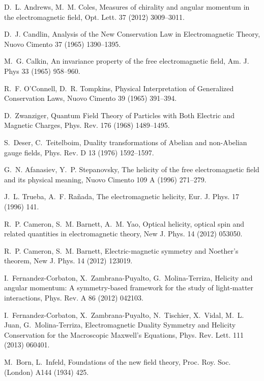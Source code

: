 \documentclass[1p,sort&compress]{elsarticle}
\numberwithin{equation}{section}
\begin{document}
\begin{thebibliography}{999}
D.~L. Andrews, M.~M. Coles, {Measures of chirality and angular momentum in the
  electromagnetic field}, Opt. Lett. 37 (2012) 3009--3011.

D.~J. Candlin, {Analysis of the New Conservation Law in Electromagnetic
  Theory}, Nuovo Cimento 37 (1965) 1390--1395.

M.~G. Calkin, {An invariance property of the free electromagnetic field}, Am.
  J. Phys 33 (1965) 958--960.

R.~F. O'Connell, D.~R. Tompkins, {Physical Interpretation of Generalized
  Conservation Laws}, Nuovo Cimento 39 (1965) 391--394.

D.~Zwanziger, {Quantum Field Theory of Particles with Both Electric and
  Magnetic Charges}, Phys. Rev. 176 (1968) 1489--1495.

S.~Deser, C.~Teitelboim, {Duality transformations of Abelian and non-Abelian
  gauge fields}, Phys. Rev. D 13 (1976) 1592--1597.

G.~N. Afanasiev, Y.~P. Stepanovsky, {The helicity of the free electromagnetic
  field and its physical meaning}, Nuovo Cimento 109 A (1996) 271--279.

J.~L. Trueba, A.~F. Ra\~nada, {The electromagnetic helicity}, Eur. J. Phys. 17
  (1996) 141.

R.~P. Cameron, S.~M. Barnett, A.~M. Yao, {Optical helicity, optical spin and
  related quantities in electromagnetic theory}, New J. Phys. 14 (2012) 053050.

R.~P. Cameron, S.~M. Barnett, {Electric-magnetic symmetry and Noether's
  theorem}, New J. Phys. 14 (2012) 123019.

I.~Fernandez-Corbaton, X.~Zambrana-Puyalto, G.~Molina-Terriza, {Helicity and
  angular momentum: A symmetry-based framework for the study of light-matter
  interactions}, Phys. Rev. A 86 (2012) 042103.

I.~Fernandez-Corbaton, X.~Zambrana-Puyalto, N.~Tischier, X.~Vidal, M.~L. Juan,
  G.~Molina-Terriza, {Electromagnetic Duality Symmetry and Helicity
  Conservation for the Macroscopic Maxwell's Equations}, Phys. Rev. Lett. 111
  (2013) 060401.

M.~Born, L.~Infeld, {Foundations of the new field theory}, Proc. Roy. Soc. 
  (London) A144 (1934) 425.


\end{thebibliography}
\end{document}

